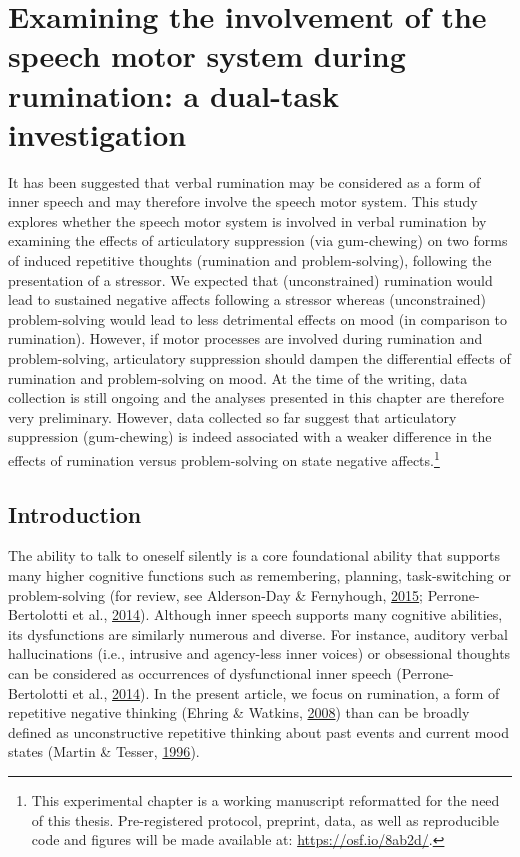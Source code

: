 \documentclass[a4paper,12pt,twoside,onecolumn,openright,final,oldfontcommands]{memoir}
\let\rmarkdownfootnote\footnote%
\def\footnote{\protect\rmarkdownfootnote}
\newcommand{\initial}[1]{
	\lettrine[lines=3,lhang=0.33,nindent=0em]{
		\color{gray}
     		{\textsc{#1}}}{}}
\begin{document}
\hypertarget{chap7}{%
\chapter{Examining the involvement of the speech motor system during rumination: a dual-task investigation}\label{chap7}}

\initial{I}t has been suggested that verbal rumination may be considered as a form of inner speech and may therefore involve the speech motor system. This study explores whether the speech motor system is involved in verbal rumination by examining the effects of articulatory suppression (via gum-chewing) on two forms of induced repetitive thoughts (rumination and problem-solving), following the presentation of a stressor. We expected that (unconstrained) rumination would lead to sustained negative affects following a stressor whereas (unconstrained) problem-solving would lead to less detrimental effects on mood (in comparison to rumination). However, if motor processes are involved during rumination and problem-solving, articulatory suppression should dampen the differential effects of rumination and problem-solving on mood. At the time of the writing, data collection is still ongoing and the analyses presented in this chapter are therefore very preliminary. However, data collected so far suggest that articulatory suppression (gum-chewing) is indeed associated with a weaker difference in the effects of rumination versus problem-solving on state negative affects.\footnote{This experimental chapter is a working manuscript reformatted for the need of this thesis. Pre-registered protocol, preprint, data, as well as reproducible code and figures will be made available at: \url{https://osf.io/8ab2d/}.}

\hypertarget{introduction-4}{%
\section{Introduction}\label{introduction-4}}

The ability to talk to oneself silently is a core foundational ability that supports many higher cognitive functions such as remembering, planning, task-switching or problem-solving (for review, see Alderson-Day \& Fernyhough, \protect\hyperlink{ref-alderson-day_inner_2015}{2015}; Perrone-Bertolotti et al., \protect\hyperlink{ref-Perrone-Bertolotti2014}{2014}). Although inner speech supports many cognitive abilities, its dysfunctions are similarly numerous and diverse. For instance, auditory verbal hallucinations (i.e., intrusive and agency-less inner voices) or obsessional thoughts can be considered as occurrences of dysfunctional inner speech (Perrone-Bertolotti et al., \protect\hyperlink{ref-Perrone-Bertolotti2014}{2014}). In the present article, we focus on rumination, a form of repetitive negative thinking (Ehring \& Watkins, \protect\hyperlink{ref-ehring_repetitive_2008}{2008}) than can be broadly defined as unconstructive repetitive thinking about past events and current mood states (Martin \& Tesser, \protect\hyperlink{ref-Martin}{1996}).
\end{document}
